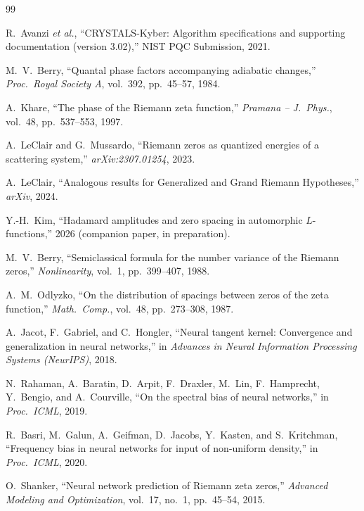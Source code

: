 \documentclass[11pt, a4paper]{article}
\theoremstyle{definition}
\theoremstyle{plain}
\begin{document}
\begin{thebibliography}{99}

R.~Avanzi \textit{et al.},
``CRYSTALS-Kyber: Algorithm specifications and supporting documentation
(version 3.02),'' NIST PQC Submission, 2021.

M.~V.~Berry,
``Quantal phase factors accompanying adiabatic changes,''
\textit{Proc.\ Royal Society A}, vol.~392, pp.~45--57, 1984.

A.~Khare,
``The phase of the Riemann zeta function,''
\textit{Pramana -- J.\ Phys.}, vol.~48, pp.~537--553, 1997.

A.~LeClair and G.~Mussardo,
``Riemann zeros as quantized energies of a scattering system,''
\textit{arXiv:2307.01254}, 2023.

A.~LeClair,
``Analogous results for Generalized and Grand Riemann Hypotheses,''
\textit{arXiv}, 2024.

Y.-H.~Kim,
``Hadamard amplitudes and zero spacing in automorphic $L$-functions,''
2026 (companion paper, in preparation).

M.~V.~Berry,
``Semiclassical formula for the number variance of the Riemann zeros,''
\textit{Nonlinearity}, vol.~1, pp.~399--407, 1988.

A.~M.~Odlyzko,
``On the distribution of spacings between zeros of the zeta function,''
\textit{Math.\ Comp.}, vol.~48, pp.~273--308, 1987.

A.~Jacot, F.~Gabriel, and C.~Hongler,
``Neural tangent kernel: Convergence and generalization in neural
networks,''
in \textit{Advances in Neural Information Processing Systems (NeurIPS)},
2018.

N.~Rahaman, A.~Baratin, D.~Arpit, F.~Draxler, M.~Lin, F.~Hamprecht,
Y.~Bengio, and A.~Courville,
``On the spectral bias of neural networks,''
in \textit{Proc.\ ICML}, 2019.

R.~Basri, M.~Galun, A.~Geifman, D.~Jacobs, Y.~Kasten, and S.~Kritchman,
``Frequency bias in neural networks for input of non-uniform density,''
in \textit{Proc.\ ICML}, 2020.

O.~Shanker,
``Neural network prediction of Riemann zeta zeros,''
\textit{Advanced Modeling and Optimization}, vol.~17, no.~1, pp.~45--54,
2015.


\end{thebibliography}
\end{document}
